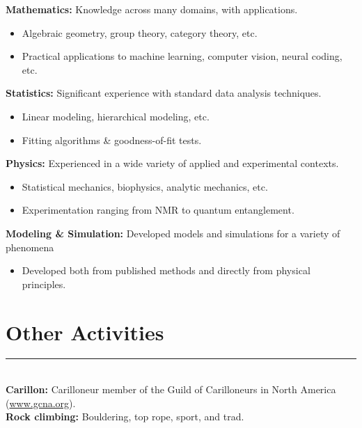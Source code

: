 \documentclass[margin]{res}
\begin{document}
\begin{resume}
\begin{itemize}
\end{itemize}\vspace{-8pt}
{\bf Mathematics:} Knowledge across many domains, with applications.
\begin{itemize} \itemsep -2pt
\item Algebraic geometry, group theory, category theory, etc. \item Practical applications to machine learning, computer vision, neural coding, etc. \end{itemize}\vspace{-8pt}
{\bf Statistics:} Significant experience with standard data analysis techniques.
\begin{itemize} \itemsep -2pt
  \item Linear modeling, hierarchical modeling, etc.
  \item Fitting algorithms \& goodness-of-fit tests. \end{itemize} \vspace{-8pt}
{\bf Physics:} Experienced in a wide variety of applied and experimental contexts.\begin{itemize} \itemsep -2pt
\item Statistical mechanics, biophysics, analytic mechanics, etc. \item Experimentation ranging from NMR to quantum entanglement. \end{itemize}\vspace{-8pt}
{\bf Modeling \& Simulation:} Developed models and simulations for a variety of phenomena
\begin{itemize} \itemsep -2pt
  \item Developed both from published methods and directly from physical principles. \end{itemize}
\vspace{1pt}\section{Other Activities} \vspace{-15pt} \rule{\textwidth}{0.5pt} \\[3pt]
{\bf Carillon:} Carilloneur member of the Guild of Carilloneurs in North America (\url{www.gcna.org}). \\[3pt]
{\bf Rock climbing:} Bouldering, top rope, sport, and trad.

\end{resume}
\end{document}
